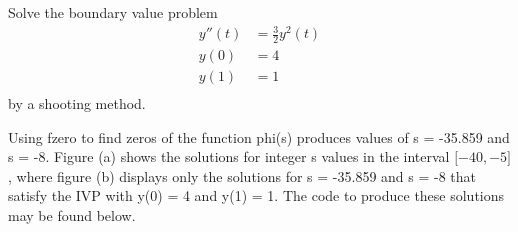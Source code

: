 \documentclass{jhwhw}
\begin{document}
\problem{}

    Solve the boundary value problem
    \begin{align*}
	y''(t) &= \frac{3}{2}y^2(t) \\
	y(0) &= 4 \\
	y(1) &= 1 \\
    \end{align*}
    by a shooting method.

\solution

    \begin{figure}[H]
	\centering
    \end{figure}

    Using fzero to find zeros of the function phi(s) produces 
    values of s = -35.859 and s = -8.
    Figure (a) shows the solutions for integer s values in the interval
    $\lbrack -40, -5\rbrack$, where figure (b) displays only the solutions
    for s = -35.859 and s = -8 that satisfy the IVP with y(0) = 4 and y(1) = 1.
    The code to produce these solutions may be found below.

    \clearpage
    \inputminted[linenos,frame=lines,framesep=2mm]{octave}{p4.m}
    \inputminted[linenos,frame=lines,framesep=2mm]{octave}{phi.m}
\end{document}
